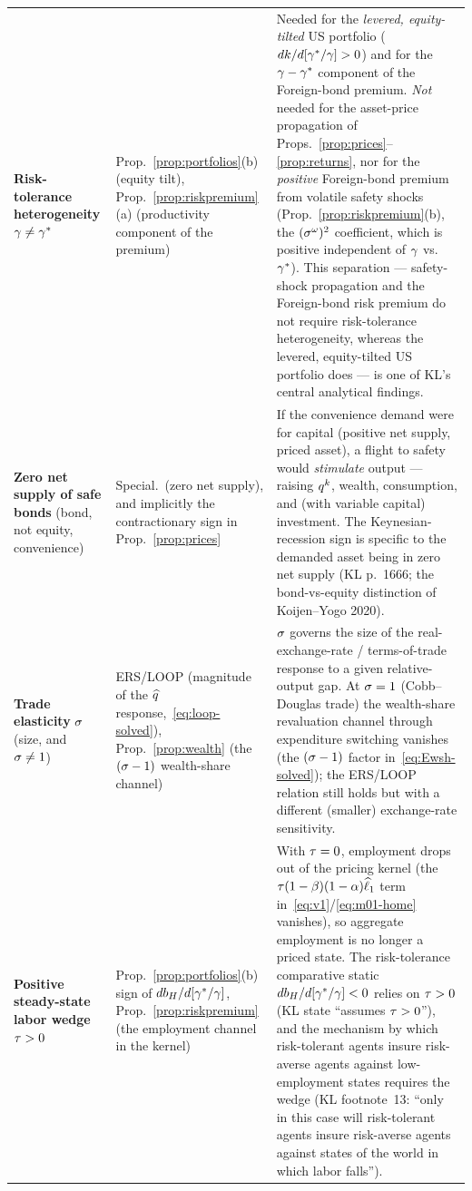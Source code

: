 \begin{longtable}{p{} p{} p{}}
\textbf{Risk-tolerance heterogeneity} $\gamma\neq\gamma^{*}$
& Prop.~\ref{prop:portfolios}(b) (equity tilt), Prop.~\ref{prop:riskpremium}(a)
(productivity component of the premium)
& Needed for the \emph{levered, equity-tilted} US portfolio
($dk/d[\gamma^{*}/\gamma]>0$) and for the $\gamma-\gamma^{*}$ component of the Foreign-bond
premium. \emph{Not} needed for the asset-price propagation of
Props.~\ref{prop:prices}--\ref{prop:returns}, nor for the \emph{positive}
Foreign-bond premium from volatile safety shocks (Prop.~\ref{prop:riskpremium}(b),
the $(\sigma^{\omega})^2$ coefficient, which is positive independent of
$\gamma$ vs.~$\gamma^{*}$). This separation --- safety-shock propagation and the
Foreign-bond risk premium do not require risk-tolerance heterogeneity, whereas
the levered, equity-tilted US portfolio does --- is one of KL's central
analytical findings.\\

\textbf{Zero net supply of safe bonds} (bond, not equity, convenience)
& Special.~(zero net supply), and implicitly the contractionary sign in
Prop.~\ref{prop:prices}
& If the convenience demand were for capital (positive net supply, priced asset),
a flight to safety would \emph{stimulate} output --- raising $q^{k}$, wealth,
consumption, and (with variable capital) investment. The Keynesian-recession sign
is specific to the demanded asset being in zero net supply (KL p.~1666; the
bond-vs-equity distinction of Koijen--Yogo 2020).\\

\textbf{Trade elasticity} $\sigma$ (size, and $\sigma\neq1$)
& ERS/LOOP (magnitude of the $\widehat{q}$ response,~\eqref{eq:loop-solved}),
Prop.~\ref{prop:wealth} (the $(\sigma-1)$ wealth-share channel)
& $\sigma$ governs the size of the real-exchange-rate / terms-of-trade response to a
given relative-output gap. At $\sigma=1$ (Cobb--Douglas trade) the wealth-share
revaluation channel through expenditure switching vanishes
(the $(\sigma-1)$ factor in~\eqref{eq:Ewsh-solved}); the ERS/LOOP relation still
holds but with a different (smaller) exchange-rate sensitivity.\\

\textbf{Positive steady-state labor wedge} $\tau>0$
& Prop.~\ref{prop:portfolios}(b) sign of $db_H/d[\gamma^{*}/\gamma]$,
Prop.~\ref{prop:riskpremium} (the employment channel in the kernel)
& With $\tau=0$, employment drops out of the pricing kernel (the
$\tau(1-\beta)(1-\alpha)\widehat{\ell}_1$ term in~\eqref{eq:v1}/\eqref{eq:m01-home}
vanishes), so aggregate employment is no longer a priced state. The
risk-tolerance comparative static $db_H/d[\gamma^{*}/\gamma]<0$ relies on $\tau>0$
(KL state ``assumes $\tau>0$''), and the mechanism by which risk-tolerant
agents insure risk-averse agents against low-employment states requires the wedge
(KL footnote~13: ``only in this case will risk-tolerant agents insure risk-averse
agents against states of the world in which labor falls'').\\


\end{longtable}
